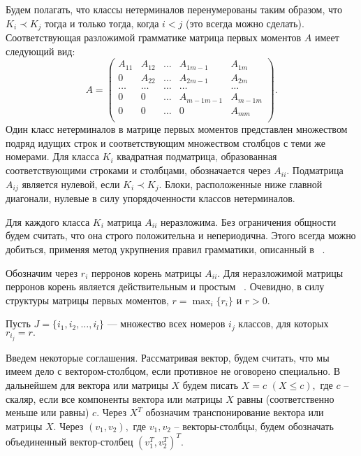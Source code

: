 \documentclass[10pt]{article}
\begin{document}
Будем полагать, что классы нетерминалов перенумерованы таким образом, что $K_i \prec K_j$ тогда и только тогда, когда $i < j$  (это всегда можно сделать). Соответствующая разложимой грамматике матрица первых моментов $A$ имеет следующий вид:
\begin{equation}\label{zhileqv1}
A=\left(
\begin{array}{ccccc} 
A_{11} & A_{12} & \ldots & A_{1 m-1} & A_{1m} \\
0 &    A_{22}   & \ldots & A_{2 m-1} & A_{2m} \\
\ldots & \ldots & \ldots & \ldots& \ldots \\
0 & 0 &  \ldots & A_{m-1 m-1} & A_{m-1 m} \\
0 & 0 &  \ldots & 0 & A_{m m} \\
\end{array}
\right).
\end{equation}
Один класс нетерминалов в матрице первых моментов представлен множеством подряд идущих строк и соответствующим множеством столбцов с теми же номерами. 
Для класса $K_i$ квадратная подматрица, образованная соответствующими строками и столбцами, обозначается через $A_{ii}$. Подматрица $A_{ij}$ является нулевой, если $K_i \prec K_j.$
Блоки, расположенные ниже главной диагонали, нулевые в силу упорядоченности классов нетерминалов. 

Для каждого класса $K_i$ матрица $A_{ii}$ неразложима. 
Без ограничения общности будем считать, что она строго положительна и непериодична. Этого всегда можно добиться, применяя метод укрупнения правил грамматики, описанный в ~\cite{zhilbib2}.

Обозначим через $r_i$ перронов корень матрицы $A_{ii}.$ Для неразложимой матрицы перронов корень является действительным и простым ~\cite{zhilbib7}.  Очевидно, в силу структуры матрицы первых моментов, $r=\max_{i} \{r_i\}$ и $r>0.$
  
Пусть $J=\{i_1,i_2, \ldots , i_l\}$ --- множество всех номеров $i_j$ классов, для которых $r_{i_j}=r.$

Введем некоторые соглашения. Рассматривая вектор, будем считать, что мы имеем дело с вектором-столбцом, если противное не оговорено специально. В дальнейшем для вектора или матрицы $X$ будем писать $X=c$ $(X \le c),$ где $c$ -- скаляр, если все компоненты вектора или матрицы $X$ равны (соответственно меньше или равны) $c.$ Через $X^T$ обозначим транспонирование вектора или матрицы $X.$ Через $(v_1,v_2),$ где $v_1,v_2$ -- векторы-столбцы, будем обозначать объединенный вектор-столбец $(v_1^T,v_2^T)^T.$ 
 
\end{document}
